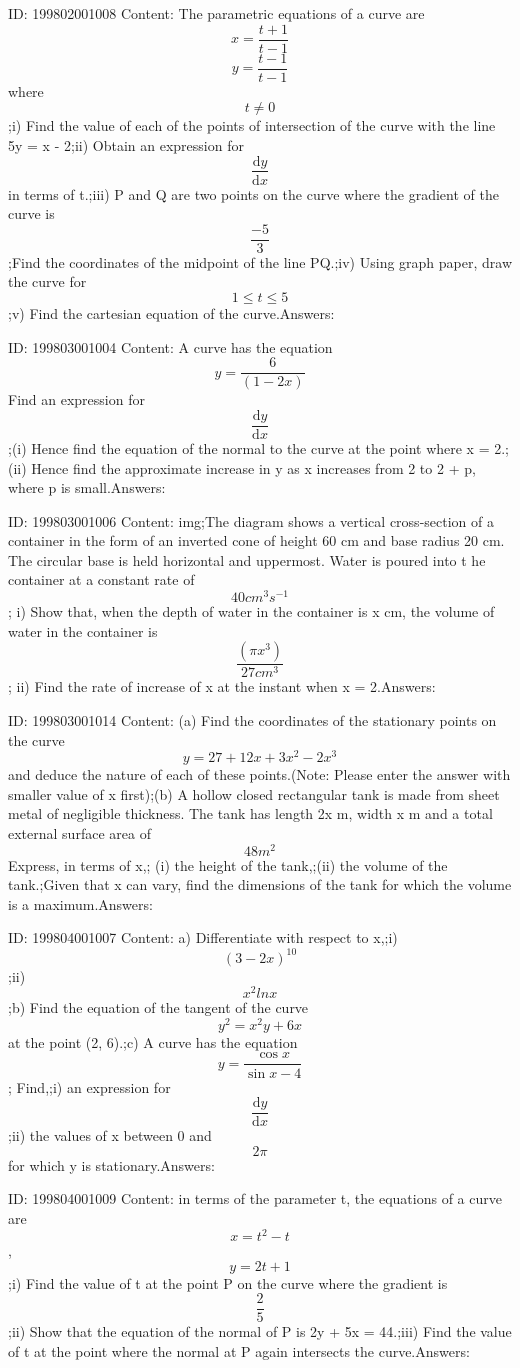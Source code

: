 \documentclass{article}
\begin{document}
ID: 199802001008
Content:
The parametric equations of a curve are \[x=\frac{t+1}{t-1}\] \[y=\frac{t-1}{t-1}\] where  \[t\neq 0\] ;i) Find the value of each of the points of intersection of the curve with the line 5y = x - 2;ii) Obtain an expression for \[\frac{\mathrm{d} y}{\mathrm{d} x}\]in terms of t.;iii) P and Q are two points on the curve where the gradient of the curve is \[\frac{-5}{3}\];Find the coordinates of the midpoint of the line PQ.;iv) Using graph paper, draw the curve for \[1\leq t\leq 5\];v) Find the cartesian equation of the curve.Answers:

ID: 199803001004
Content:
A curve has the equation \[y=\frac{6}{(1-2x)}\] Find an expression for \[\frac{\mathrm{d} y}{\mathrm{d} x}\] ;(i) Hence find the equation of the normal to the curve at the point where x = 2.;(ii) Hence find the approximate increase in y as x increases from 2 to 2 + p, where p is small.Answers:

ID: 199803001006
Content:
img;The diagram shows a vertical cross-section of a container in the form of an inverted cone of height 60 cm and base radius 20 cm. The circular base is held horizontal and uppermost. Water is poured into t he container at a constant rate of \[40cm^3s^{-1}\]; i) Show that, when the depth of water in the container is x cm, the volume of water in the container is \[\frac{(\pi x^3)}{27cm^3}\]; ii) Find the rate of increase of x at the instant when x = 2.Answers:

ID: 199803001014
Content:
(a)	Find the coordinates of the stationary points on the curve \[y=27+12x+3x^2-2x^3\] and deduce the nature of each of these points.(Note: Please enter the answer with smaller value of x first);(b)	A hollow closed rectangular tank is made from sheet metal of negligible thickness. The tank has length 2x m, width x m and a total external surface area of \[48m^2\] Express, in terms of x,; (i)	the height of the tank,;(ii)	the volume of the tank.;Given that x can vary, find the dimensions of the tank for which the volume is a maximum.Answers:

ID: 199804001007
Content:
a) Differentiate with respect to x,;i) \[(3-2x)^{10}\];ii) \[x^2lnx\];b) Find the equation of the tangent of the curve  \[y^2=x^2y+6x\]  at the point (2, 6).;c) A curve has the equation \[y=\frac{\cos x}{\sin x-4}\]; Find,;i) an expression for \[\frac{\mathrm{d} y}{\mathrm{d} x}\];ii) the values of x between 0 and \[2\pi\] for which y is stationary.Answers:

ID: 199804001009
Content:
in terms of the parameter t, the equations of a curve are \[x=t^2-t\], \[y=2t+1\];i) Find the value of t at the point P on the curve where the gradient is \[\frac{2}{5}\];ii) Show that the equation of the normal of P is 2y + 5x = 44.;iii) Find the value of t at the point where the normal at P again intersects the curve.Answers:
\end{document}
